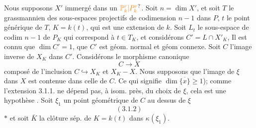  Nous supposons  $X'$ immergé dans un $\unsure{\mathbb P^r_k|P^r_k}$.  Soit $n=\dim X'$, et soit $T$ le grassmannien des sous-espaces projectifs de codimension $n-1$  dans $P$,  $t$ le point générique de $T$, $K=k(t)$, qui est une extension   de $k$.  Soit $L_t$ le sous-espace  de codim $n-1$  de $P_K$ qui correspond à $t\in T_K$, et considérons $C'=L\cap X'_K$,  Il est connu que $\dim C'=1$, que $C'$ est géom. normal et géom connexe. Soit $C$ l'image inverse de $X_K$ dans $C'$.
Considérons  le morphisme canonique
\[C\longrightarrow X\]
composé de l'inclusion $C\hookrightarrow X_K$ et $X_K-X$.
Nous supposons que  l'image de $\xi$ dans $X$ est contenue dans celle de $C$. Ce qui signifie $\dim\overline{\{x\}}\geq1$);  comme l'extension 3.1.1. ne dépend pas, à isom. près, du choix de $\xi$, cela est une hypothèse . Soit $\xi_1$ un point géométrique de $C$ au dessus de $\xi$
\[(3.1.2)\]
 $*$
et soit $\bar K$ la clôture sép. de $K=k(t)$ dans $\kappa(\xi_1)$.
